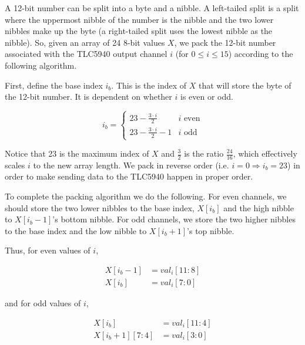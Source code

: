    A 12-bit number can be split into a byte and a nibble.  A left-tailed
    split is a split where the uppermost nibble of the number is the nibble
    and the two lower nibbles make up the byte (a right-tailed split uses
    the lowest nibble as the nibble).  So, given an array of 24 8-bit
    values $X$, we pack the 12-bit number associated with the TLC5940
    output channel $i$ (for $0\leq i \leq 15$) according to the following algorithm.

    First, define the base index $i_b$.  This is the index of $X$ that will store
    the byte of the 12-bit number.  It is dependent on whether $i$ is even
    or odd.

    \begin{equation}
        i_b = \left\{
            \begin{array}{ll}
                23 - \frac{3\cdot i}{2} & \textrm{$i$ even} \\
                23 - \frac{3\cdot i}{2} - 1 & \textrm{$i$ odd}
            \end{array}
            \right.
    \end{equation}
    
    Notice that 23 is the maximum index of $X$ and $\frac{3}{2}$ is the
    ratio $\frac{24}{16}$, which effectively scales $i$ to the new array
    length.  We pack in reverse order (i.e. $i=0 \Rightarrow i_b=23$) in
    order to make sending data to the TLC5940 happen in proper order.

    To complete the packing algorithm we do the following.  For even
    channels, we should store the two lower nibbles to the base index,
    $X[i_b]$ and the high nibble to $X[i_b-1]$'s bottom nibble.  For odd
    channels, we store the two higher nibbles to the base index and the low
    nibble to $X[i_b+1]$'s top nibble.

    Thus, for even values of $i$,
    
    \begin{align}
        X[i_b-1] &= val_i[11:8] \\
        X[i_b] &= val_i[7:0]
    \end{align}

    and for odd values of $i$,

    \begin{align}
        X[i_b] &= val_i[11:4] \\
        X[i_b+1][7:4] &= val_i[3:0]
    \end{align}

